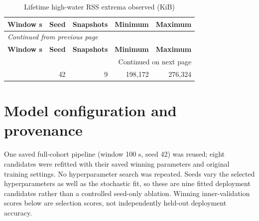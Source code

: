 \documentclass[10pt,a4paper]{article}
\begin{document}
\begingroup\small\setlength{\tabcolsep}{4pt}\renewcommand{\arraystretch}{1.12}
\begin{longtable}{@{}lrrrr@{}}
\caption{Lifetime high-water RSS extrema observed (KiB)}\\
\toprule
\textbf{Window s} & \textbf{Seed} & \textbf{Snapshots} & \textbf{Minimum} & \textbf{Maximum} \\
\midrule\endfirsthead
\multicolumn{5}{l}{\small\itshape Continued from previous page}\\
\toprule
\textbf{Window s} & \textbf{Seed} & \textbf{Snapshots} & \textbf{Minimum} & \textbf{Maximum} \\
\midrule\endhead
\midrule\multicolumn{5}{r}{\small Continued on next page}\\\endfoot
\bottomrule\endlastfoot
100 & 42 & 9 & 198,172 & 276,324 \\
\end{longtable}\endgroup
\section{Model configuration and provenance}
One saved full-cohort pipeline (window 100 s, seed 42) was reused; eight candidates were refitted with their saved winning parameters and original training settings. No hyperparameter search was repeated. Seeds vary the selected hyperparameters as well as the stochastic fit, so these are nine fitted deployment candidates rather than a controlled seed-only ablation. Winning inner-validation scores below are selection scores, not independently held-out deployment accuracy.
\end{document}
